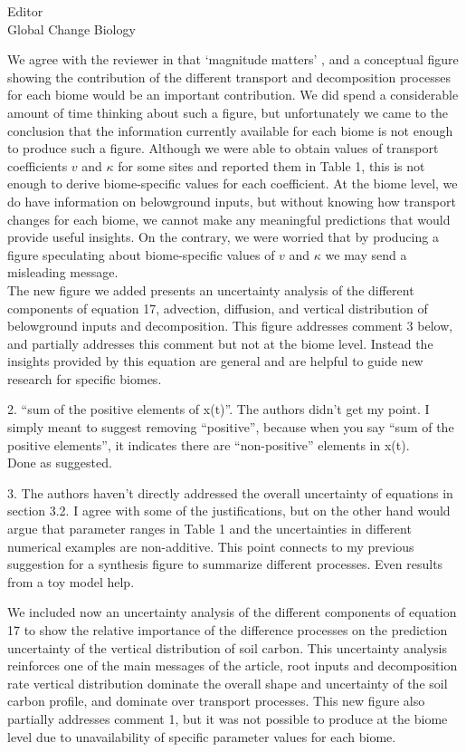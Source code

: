 \documentclass[11pt]{bgcletter}
\newcommand{\answer}[1] {
{\color{cyan} #1}
}
\begin{document}
\begin{letter}{Editor\\
   Global Change Biology
}
\answer{We agree with the reviewer in that `magnitude matters' , and a conceptual figure showing the contribution of the different transport and decomposition processes for each biome would be an important contribution. We did spend a considerable amount of time thinking about such a figure, but unfortunately we came to the conclusion that the information currently available for each biome is not enough to produce such a figure. Although we were able to obtain values of transport coefficients $v$ and $\kappa$ for some sites and reported them in Table 1, this is not enough to derive biome-specific values for each coefficient. At the biome level, we do have information on belowground inputs, but without knowing how transport changes for each biome, we cannot make any meaningful predictions that would provide useful insights. On the contrary, we were worried that by producing a figure speculating about biome-specific values of $v$ and $\kappa$ we may send a misleading message. \\ The new figure we added presents an uncertainty analysis of the different components of equation 17, advection, diffusion, and vertical distribution of belowground inputs and decomposition. This figure addresses comment 3 below, and partially addresses this comment but not at the biome level. Instead the insights provided by this equation are general and are helpful to guide new research for specific biomes.  }

2. ``sum of the positive elements of x(t)''. The authors didn't get my point. I simply meant to suggest removing ``positive'', because when you say ``sum of the positive elements'', it indicates there are ``non-positive'' elements in x(t). \\
\answer{Done as suggested.}

3. The authors haven't directly addressed the overall uncertainty of equations in section 3.2. I agree with some of the justifications, but on the other hand would argue that parameter ranges in Table 1 and the uncertainties in different numerical examples are non-additive. This point connects to my previous suggestion for a synthesis figure to summarize different processes. Even results from a toy model help.

\answer{We included now an uncertainty analysis of the different components of equation 17 to show the relative importance of the difference processes on the prediction uncertainty of the vertical distribution of soil carbon. This uncertainty analysis reinforces one of the main messages of the article, root inputs and decomposition rate vertical distribution dominate the overall shape and uncertainty of the soil carbon profile, and dominate over transport processes. This new figure also partially addresses comment 1, but it was not possible to produce at the biome level due to unavailability of specific parameter values for each biome. }


\end{letter}
\end{document}
